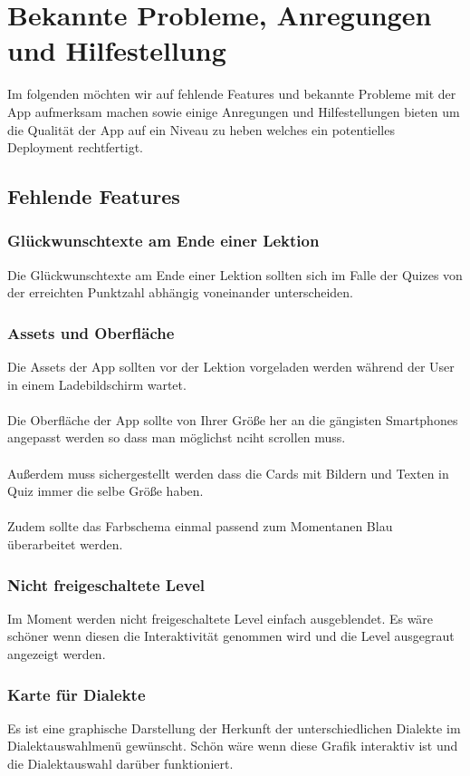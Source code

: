 
\section{Bekannte Probleme, Anregungen und Hilfestellung}
Im folgenden möchten wir auf fehlende Features und bekannte Probleme mit der App aufmerksam machen sowie einige Anregungen und Hilfestellungen bieten um die Qualität der App auf ein Niveau zu heben welches ein potentielles Deployment rechtfertigt.

\subsection{Fehlende Features}
\subsubsection*{Glückwunschtexte am Ende einer Lektion}
Die Glückwunschtexte am Ende einer Lektion sollten sich im Falle der Quizes von der erreichten Punktzahl abhängig voneinander unterscheiden.

\subsubsection*{Assets und Oberfläche}
Die Assets der App sollten vor der Lektion vorgeladen werden während der User in einem Ladebildschirm wartet.\\\\
Die Oberfläche der App sollte von Ihrer Größe her an die gängisten Smartphones angepasst werden so dass man möglichst nciht scrollen muss.\\\\
Außerdem muss sichergestellt werden dass die Cards mit Bildern und Texten in Quiz immer die selbe Größe haben.\\\\
Zudem sollte das Farbschema einmal passend zum Momentanen Blau überarbeitet werden.

\subsubsection*{Nicht freigeschaltete Level}
Im Moment werden nicht freigeschaltete Level einfach ausgeblendet. Es wäre schöner wenn diesen die Interaktivität genommen wird und die Level ausgegraut angezeigt werden.

\subsubsection*{Karte für Dialekte}
Es ist eine graphische Darstellung der Herkunft der unterschiedlichen Dialekte im Dialektauswahlmenü gewünscht. Schön wäre wenn diese Grafik interaktiv ist und die Dialektauswahl darüber funktioniert.

